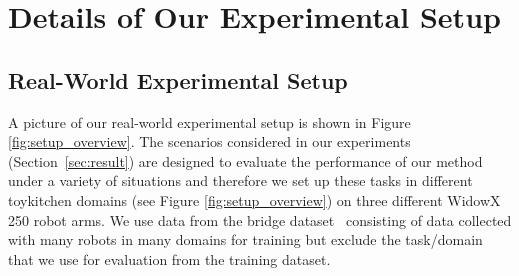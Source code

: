 \documentclass[../thesis.tex]{subfiles}
\begin{document}
\begin{table}[h]
\centering
{}
\caption{\label{tab:sim_complete} \footnotesize{\textbf{Performance of \ptrmethodname in comparison with other methods} on the simulated bin sorting task, trained for many more gradient steps for all methods until each one of them converges. Observe that \ptrmethodname substantially outperforms other prior methods, including joint training on the same data with BC or CQL. Training on target data only is unable to recover a non-zero performance, so we do not report it in this table. Since the 95\%-confidence intervals do not overlap between \ptrmethodname and other methods, it indicates that \ptrmethodname improves upon baselines in a statistically significant manner.}}
\end{table}



\section{Details of Our Experimental Setup}
\label{app:exp_setup}

\vspace{0.1cm}
\subsection{Real-World Experimental Setup}

A picture of our real-world experimental setup is shown in Figure \ref{fig:setup_overview}. The scenarios considered in our experiments (Section~\ref{sec:result}) are designed to evaluate the performance of our method under a variety of situations and therefore we set up these tasks in different toykitchen domains (see Figure \ref{fig:setup_overview}) on three different WidowX 250 robot arms. We use data from the bridge dataset~\citep{ebert2021bridge} consisting of data collected with many robots in many domains for training but exclude the task/domain that we use for evaluation from the training dataset.  
\end{document}
